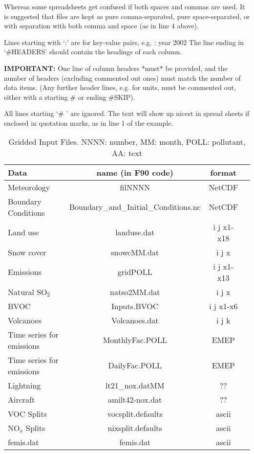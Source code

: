 Whereas some spreadsheets get confused if both spaces and commas
are used. It is suggested that files are kept as 
pure comma-separated,
pure space-separated,
or with separation with both comma and space (as in line 4 above).
\bigskip

Lines starting with `:' are for key-value pairs, e.g. : year 2002
The line ending in `\#HEADERS' should contain the headings of each column.
\bigskip

{\bf IMPORTANT:} One line of column headers *must* be provided, and the
 number of headers (excluding commented out ones)  must match the number of data items.
(Any further header lines, e.g. for units, must be commented out, either with
a starting \# or ending \#SKIP).

 All lines starting `\# ' are ignored. The text will show up nicest in
 spread sheets if enclosed in quotation marks, as in line 1 of the example.

\begin{table}[h]
\caption{Gridded Input Files. NNNN: number, MM: month, POLL: pollutant, AA: text}
\label{Tab:Inputs}
\begin{tabular}{lccc}\hline
Data & name (in F90 code) & format\\ \hline
Meteorology&filNNNN&NetCDF\\
Boundary Conditions&Boundary\_and\_Initial\_Conditions.nc&NetCDF\\
Land use&landuse.dat&i j x1-x18 \\ %
Snow cover&snowcMM.dat&i j x\\
Emissions&gridPOLL&i j x1-x13\\
Natural SO$_{2}$&natso2MM.dat&i j x\\
BVOC&Inputs.BVOC&i j x1-x6 \\ %
Volcanoes&Volcanoes.dat&i j k   \\ %
Time series for emissions&MonthlyFac.POLL&EMEP\\
Time series for emissions&DailyFac.POLL&EMEP\\
Lightning&lt21\_nox.datMM&??& \\
Aircraft&amilt42-nox.dat&??&\\
VOC Splits&vocsplit.defaults&ascii \\
NO$_{x}$ Splits& nixsplit.defaults&ascii\\
femis.dat & femis.dat    & ascii  \\
\hline
\end{tabular}
\end{table}


